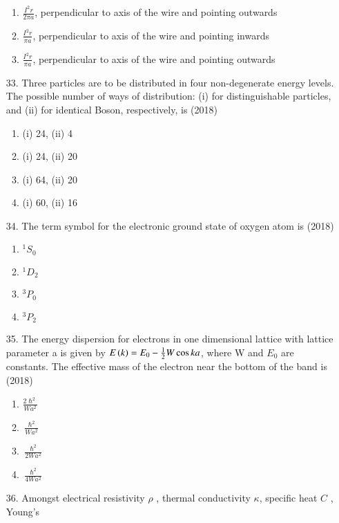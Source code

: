 \documentclass[journal]{IEEEtran}
\begin{document}
\begin{enumerate}
\begin{enumerate}[label = (\Alph*)]
        \item $\frac{I^2r}{2\pi a}$, perpendicular to axis of the wire and pointing outwards
        \item  $\frac{I^2r}{\pi a}$, perpendicular to axis of the wire and pointing inwards
        \item  $\frac{I^2r}{\pi a}$, perpendicular to axis of the wire and pointing outwards 
    \end{enumerate}
    \item[33.] Three particles are to be distributed in four non-degenerate energy levels. The possible
    number of ways of distribution: (i) for distinguishable particles, and (ii) for identical
    Boson, respectively, is \hfill (2018)
    \begin{enumerate}[label = (\Alph*)]
        \item  (i) 24, (ii) 4 
        \item  (i) 24, (ii) 20 
        \item  (i) 64, (ii) 20 
        \item  (i) 60, (ii) 16
    \end{enumerate}
    \item[34.] The term symbol for the electronic ground state of oxygen atom is    \hfill (2018)
    \begin{enumerate}[label=(\Alph*)]
        \item $^1S_0$
        \item $^1D_2$
        \item $^3P_0$
        \item $^3P_2$
    \end{enumerate}
    \item[35.] The energy dispersion for electrons in one dimensional lattice with lattice parameter a is
    given by $E\left(k\right) = E_0-\frac{1}{2}W\cos ka$, where W and $E_0$ are constants. The effective mass of
    the electron near the bottom of the band is \hfill (2018)
    \begin{enumerate}[label=(\Alph*)]
        \item $\frac{2\hslash^2}{Wa^2}$
        \item $\frac{\hslash^2}{Wa^2}$
        \item $\frac{\hslash^2}{2Wa^2}$
        \item $\frac{\hslash^2}{4Wa^2}$
    \end{enumerate}
    \item[36.] Amongst electrical resistivity $\rho$ , thermal conductivity $\kappa$, specific heat $C$ , Young’s

\end{enumerate}
\end{document}
